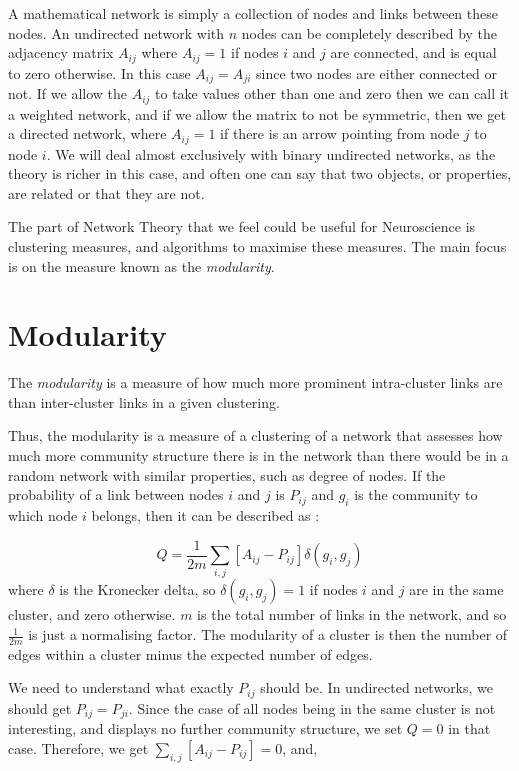 \documentclass[a4paper,12pt]{report}
\begin{document}
A mathematical network is simply a collection of nodes and links between
these nodes.  An undirected network with $n$ nodes can be
completely described by the adjacency matrix $A_{ij}$ where $A_{ij} =
1$ if nodes $i$ and $j$ are connected, and is equal to zero otherwise. In this 
case $A_{ij} = A_{ji}$ since two nodes are either connected or
not.  If we allow the $A_{ij}$ to take values other than one and zero
then we can call it a weighted network, and if we allow the matrix to
not be symmetric, then we get a directed network, where $A_{ij} = 1$ if there 
is an arrow pointing from node $j$ to node $i$.  We will deal almost
exclusively with binary undirected networks, as the theory is richer
in this case, and often one can say that two objects, or properties, are 
related or that they are not.

The part of Network Theory that we feel could be useful for
Neuroscience is clustering measures, and algorithms to maximise these
measures.  The main focus is on the measure known as the
\emph{modularity}.

\section{Modularity}

The \emph{modularity} is a measure of how much more prominent
intra-cluster links are than inter-cluster links in a given
clustering. 

Thus, the modularity is a measure of a clustering of a network that assesses 
how much more community structure there is in the network than there would be 
in a random network with similar properties, such as degree of nodes.  If the 
probability of a link between nodes $i$ and $j$ is $P_{ij}$ and $g_i$ is the 
community to which node $i$ belongs, then it can be described as 
\cite{Newman2006b}:

\begin{equation}
Q = \frac{1}{2m}\sum_{i,j}[A_{ij} - P_{ij}]\delta(g_i,g_j)
\end{equation}
where $\delta$ is the Kronecker delta, so $\delta(g_i,g_j)=1$ if nodes 
$i$ and $j$ are in the same cluster, and zero otherwise. $m$ is the total 
number of links in the network, and so $\frac{1}{2m}$ is just a normalising 
factor.  The modularity of a cluster is then the number of edges within a 
cluster minus the expected number of edges.

We need to understand what exactly $P_{ij}$ should be.  In undirected networks, 
we should get $P_{ij} = P_{ji}$.  Since the case of all nodes being in the same 
cluster is not interesting, and displays no further community structure, we set 
$Q=0$ in that case.  Therefore, we get $\sum_{i,j}[A_{ij} - P_{ij}] = 0$, and,
\end{document}
